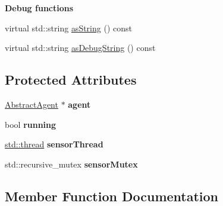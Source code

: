\begin{Indent}{\bf Debug functions}\par
\begin{DoxyCompactItemize}
\item 
virtual std\+::string \hyperlink{class_model_1_1_abstract_sensor_a85c18d6d51b8b6a3b97f682ad242be9d}{as\+String} () const 
\item 
virtual std\+::string \hyperlink{class_model_1_1_abstract_sensor_aa67bce32b6a602772773f0f23d0634f0}{as\+Debug\+String} () const 
\end{DoxyCompactItemize}
\end{Indent}
\subsection*{Protected Attributes}
\begin{DoxyCompactItemize}
\item 
\hyperlink{class_model_1_1_abstract_agent}{Abstract\+Agent} $\ast$ {\bfseries agent}\hypertarget{class_model_1_1_abstract_sensor_acc26be4569ca92c524e3759f8bda8e36}{}\label{class_model_1_1_abstract_sensor_acc26be4569ca92c524e3759f8bda8e36}

\item 
bool {\bfseries running}\hypertarget{class_model_1_1_abstract_sensor_ad4cbae39fd0117e9917c33a6a7f09fa5}{}\label{class_model_1_1_abstract_sensor_ad4cbae39fd0117e9917c33a6a7f09fa5}

\item 
\hyperlink{namespacestd_af8ef78a9cf464d7f7faf334b0648cd20}{std\+::thread} {\bfseries sensor\+Thread}\hypertarget{class_model_1_1_abstract_sensor_a7de4321e9fa04d352cd42b7f33e2ce9c}{}\label{class_model_1_1_abstract_sensor_a7de4321e9fa04d352cd42b7f33e2ce9c}

\item 
std\+::recursive\+\_\+mutex {\bfseries sensor\+Mutex}\hypertarget{class_model_1_1_abstract_sensor_ab8de89a6213d2a76d930e02a3cac3947}{}\label{class_model_1_1_abstract_sensor_ab8de89a6213d2a76d930e02a3cac3947}

\end{DoxyCompactItemize}


\subsection{Member Function Documentation}
